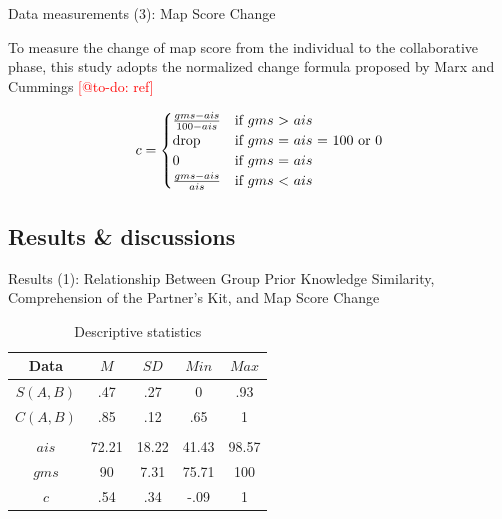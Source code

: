 \begin{frame}{Data measurements (3): Map Score Change}

To measure the change of map score from the individual to the collaborative phase, this 
study adopts the normalized change formula proposed by Marx and Cummings 
\textcolor{red}{[@to-do: ref]}

\begin{equation}
 c =
    \begin{cases}
        \frac{gms - ais}{100 - ais} & \text{if $gms$ > $ais$}\\
        $drop$ & \text{if $gms$ = $ais$ = 100 or 0} \\
        0 & \text{if $gms$ = $ais$}\\
        \frac{gms - ais}{ais} & \text{if $gms$ < $ais$}
    \end{cases}
    \label{eq:7}
\end{equation}
    
\end{frame}


\subsection{Results \& discussions}
\begin{frame}{Results (1): Relationship Between Group Prior Knowledge Similarity, 
   Comprehension of the Partner’s Kit, and Map Score Change}

\begin{table}[tb]
    \caption{Descriptive statistics}
    \label{desc_stat}
    \begin{center}
        \begin{tabular}{c|c|c|c|c}
            \hline
            Data & $M$ & $SD$ & $Min$ & $Max$\\
            \hline
            $S(A, B)$ & .47 & .27 & 0 & .93 \\
            $C(A, B)$ & .85 & .12 & .65 & 1 \\
            & & & &\\
            $ais$ & 72.21 & 18.22 & 41.43 & 98.57 \\
            $gms$ & 90 & 7.31 & 75.71 & 100 \\
            $c$ & .54 & .34 & -.09 & 1 \\
            \hline
        \end{tabular}
    \end{center}
\end{table}
\end{frame}


